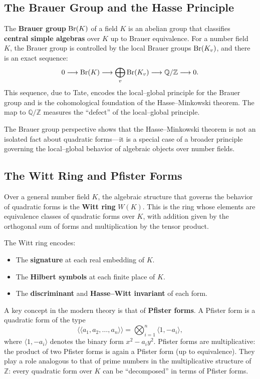 \subsection{The Brauer Group and the Hasse Principle}

The \textbf{Brauer group} $\operatorname{Br}(K)$ of a field $K$ is an abelian group that classifies \textbf{central simple algebras} over $K$ up to Brauer equivalence. For a number field $K$, the Brauer group is controlled by the local Brauer groups $\operatorname{Br}(K_v)$, and there is an exact sequence:
\[
    0 \longrightarrow \operatorname{Br}(K) \longrightarrow \bigoplus_v \operatorname{Br}(K_v) \longrightarrow \mathbb{Q}/\mathbb{Z} \longrightarrow 0.
\]
This sequence, due to Tate, encodes the local--global principle for the Brauer group and is the cohomological foundation of the Hasse--Minkowski theorem. The map to $\mathbb{Q}/\mathbb{Z}$ measures the ``defect'' of the local--global principle.

The Brauer group perspective shows that the Hasse--Minkowski theorem is not an isolated fact about quadratic forms---it is a special case of a broader principle governing the local--global behavior of algebraic objects over number fields.

\subsection{The Witt Ring and Pfister Forms}

Over a general number field $K$, the algebraic structure that governs the behavior of quadratic forms is the \textbf{Witt ring} $W(K)$. This is the ring whose elements are equivalence classes of quadratic forms over $K$, with addition given by the orthogonal sum of forms and multiplication by the tensor product.

The Witt ring encodes:
\begin{itemize}
    \item The \textbf{signature} at each real embedding of $K$.
    \item The \textbf{Hilbert symbols} at each finite place of $K$.
    \item The \textbf{discriminant} and \textbf{Hasse--Witt invariant} of each form.
\end{itemize}

A key concept in the modern theory is that of \textbf{Pfister forms}. A Pfister form is a quadratic form of the type
\[
    \langle\langle a_1, a_2, \ldots, a_n \rangle\rangle = \bigotimes_{i=1}^n \langle 1, -a_i \rangle,
\]
where $\langle 1, -a_i \rangle$ denotes the binary form $x^2 - a_i y^2$. Pfister forms are multiplicative: the product of two Pfister forms is again a Pfister form (up to equivalence). They play a role analogous to that of prime numbers in the multiplicative structure of $\mathbb{Z}$: every quadratic form over $K$ can be ``decomposed'' in terms of Pfister forms.

